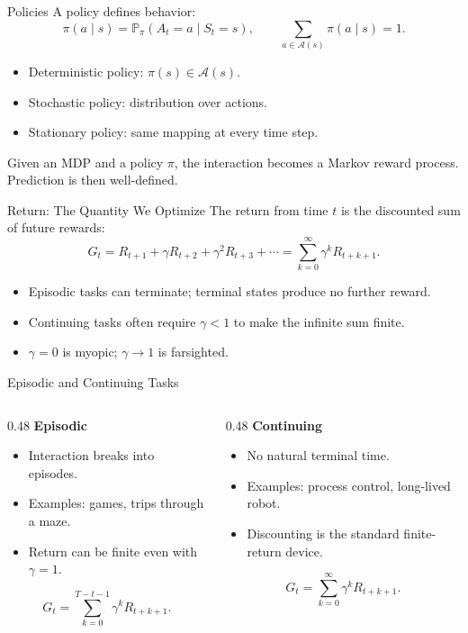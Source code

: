 \documentclass[aspectratio=169]{beamer}
\newcommand{\PP}{\mathbb{P}}
\newcommand{\Aspace}{\mathcal{A}}
\begin{document}
\begin{frame}{Policies}
\small
A policy defines behavior:
\[
\pi(a\mid s)=\PP_\pi(A_t=a\mid S_t=s),
\qquad
\sum_{a\in\Aspace(s)}\pi(a\mid s)=1.
\]

\begin{itemize}
    \item Deterministic policy: $\pi(s)\in\Aspace(s)$.
    \item Stochastic policy: distribution over actions.
    \item Stationary policy: same mapping at every time step.
\end{itemize}

\vspace{0.8em}
Given an MDP and a policy $\pi$, the interaction becomes a Markov reward process. Prediction is then well-defined.
\end{frame}

\begin{frame}{Return: The Quantity We Optimize}
\small
The return from time $t$ is the discounted sum of future rewards:
\[
G_t = R_{t+1}+\gamma R_{t+2}+\gamma^2 R_{t+3}+\cdots
    = \sum_{k=0}^{\infty}\gamma^k R_{t+k+1}.
\]

\begin{itemize}
    \item Episodic tasks can terminate; terminal states produce no further reward.
    \item Continuing tasks often require $\gamma<1$ to make the infinite sum finite.
    \item $\gamma=0$ is myopic; $\gamma\rightarrow 1$ is farsighted.
\end{itemize}
\end{frame}

\begin{frame}{Episodic and Continuing Tasks}
\small
\begin{columns}[T,onlytextwidth]
\begin{column}{0.48\textwidth}
\textbf{Episodic}
\begin{itemize}
    \item Interaction breaks into episodes.
    \item Examples: games, trips through a maze.
    \item Return can be finite even with $\gamma=1$.
\end{itemize}
\[
G_t=\sum_{k=0}^{T-t-1}\gamma^k R_{t+k+1}.
\]
\end{column}
\begin{column}{0.48\textwidth}
\textbf{Continuing}
\begin{itemize}
    \item No natural terminal time.
    \item Examples: process control, long-lived robot.
    \item Discounting is the standard finite-return device.
\end{itemize}
\[
G_t=\sum_{k=0}^{\infty}\gamma^k R_{t+k+1}.
\]
\end{column}
\end{columns}
\end{frame}
\end{document}
